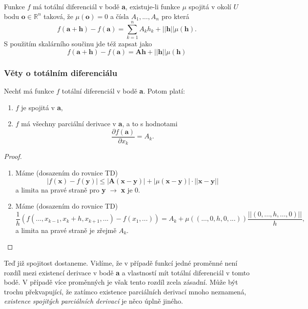 \documentclass[../main.tex]{subfiles}
\begin{document}
\begin{definition}
	Funkce $f$ má totální diferenciál v bodě \textbf{a}, existuje-li funkce $\mu$ spojitá v okolí $U$ bodu $\textbf{o} \in \mathbb{R}^n$ taková, že $\mu(\textbf{o}) = 0$
	a čísla $A_1,...,A_n$ pro která
	\[f(\textbf{a}+\textbf{h}) - f(\textbf{a}) = \sum^n_{k=1}A_kh_k+||\textbf{h}||\mu(\textbf{h}).\]
	S použitím skalárního součinu jde též zapsat jako
	$$f(\textbf{a} + \textbf{h}) - f(\textbf{a}) = \textbf{Ah} + ||\textbf{h}|| \mu (\textbf{h})$$
\end{definition}

\subsubsection{Věty o totálním diferenciálu}

\begin{lemma}\label{eq:satd}
	Nechť má funkce $f$ totální diferenciál v bodě \textbf{a}. Potom platí:
	\begin{enumerate}
	    \item $f$ je spojitá v \textbf{a},
	    \item $f$ má všechny parciální derivace v \textbf{a}, a to s hodnotami 
	    \[\frac{\partial f(\textbf{a})}{\partial x_k} = A_k.\]
	\end{enumerate}
\end{lemma}

\begin{proof}
	\begin{enumerate}
		\item Máme (dosazením do rovnice TD) \[|f(\textbf{x}) - f(\textbf{y})| \leq |\textbf{A}(\textbf{x}-\textbf{y})| + |\mu(\textbf{x}-\textbf{y})|\cdot||\textbf{x}-\textbf{y}||\]
		a limita na pravé straně pro \textbf{y} $\rightarrow$ \textbf{x} je 0.
		\item Máme (dosazením do rovnice TD) \[\frac{1}{h}(f(..., x_{k-1},x_k+h,x_{k+1},...) - f(x_1,...)) = A_k + \mu((...,0,h,0,...))\frac{||(0,...,h,...,0)||}{h},\]
		a limita na pravé straně je zřejmě $A_k$.
	\end{enumerate}
\end{proof}

Teď již spojitost dostaneme. Vidíme, že v případě funkcí jedné proměnné není rozdíl mezi existencí derivace v bodě \textbf{a} a vlastností
mít totální diferenciál v tomto bodě. V případě více proměnných je však tento rozdíl zcela zásadní. Může být trochu překvapující, že 
zatímco existence parciálních derivací mnoho neznamená, \textit{existence spojitých parciálních derivací} je něco úplně jiného.
\end{document}
